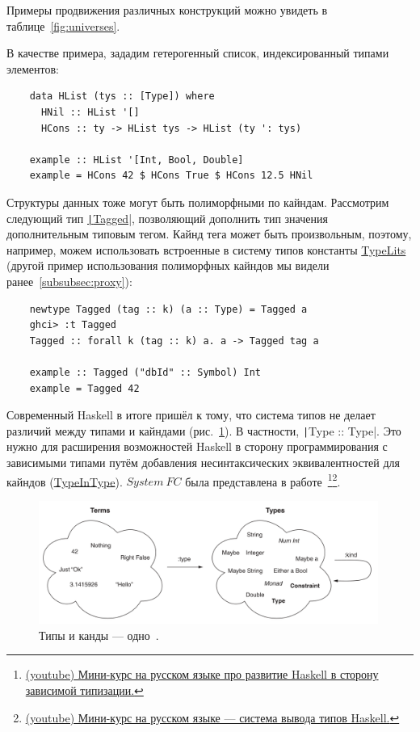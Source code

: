 Примеры продвижения различных конструкций можно увидеть в таблице~\ref{fig:universes}.

В качестве примера, зададим гетерогенный список, индексированный типами элементов:
\begin{verbatim}
    data HList (tys :: [Type]) where
      HNil :: HList '[]
      HCons :: ty -> HList tys -> HList (ty ': tys)

    example :: HList '[Int, Bool, Double]
    example = HCons 42 $ HCons True $ HCons 12.5 HNil
\end{verbatim}

Структуры данных тоже могут быть полиморфными по кайндам.
Рассмотрим следующий тип \href{https://hackage.haskell.org/package/tagged-0.8.8/docs/Data-Tagged.html#t:Tagged}{\texttt|Tagged|}, позволяющий дополнить тип значения дополнительным типовым тегом.
Кайнд тега может быть произвольным, поэтому, например, можем использовать встроенные в систему типов константы \href{https://ghc.gitlab.haskell.org/ghc/doc/users_guide/exts/type_literals.html}{TypeLits} (другой пример использования полиморфных кайндов мы видели ранее\ \ref{subsubsec:proxy}):
\begin{verbatim}
    newtype Tagged (tag :: k) (a :: Type) = Tagged a
    ghci> :t Tagged
    Tagged :: forall k (tag :: k) a. a -> Tagged tag a

    example :: Tagged ("dbId" :: Symbol) Int
    example = Tagged 42
\end{verbatim}

Современный Haskell в итоге пришёл к тому, что система типов не делает различий между типами и кайндами (рис.~\ref{fig:types-eq-kinds}).
В частности, \texttt|Type :: Type|.
Это нужно для расширения возможностей Haskell в сторону программирования с зависимыми типами путём добавления несинтаксических эквивалентностей для кайндов (\href{https://ghc.gitlab.haskell.org/ghc/doc/users_guide/exts/poly_kinds.html#extension-TypeInType}{TypeInType}).
$System~FC$ была представлена в работе~\cite{weirich2013system}\footnote{\href{https://www.youtube.com/watch?v=ISGENChlA4M&list=PLvPsfYrGz3wufQguebnCduYgQQ9UMeJRt}{(youtube) Мини-курс на русском языке про развитие Haskell в сторону зависимой типизации.}}\footnote{\href{https://www.youtube.com/watch?v=_HYI7zjkrEs&list=PLvPsfYrGz3wuVAGhNf6-i7uafXg56oqM5&index=1}{(youtube) Мини-курс на русском языке --- система вывода типов Haskell.}}. %

\begin{figure}[h]
    \centering
    \includegraphics[width=0.99\textwidth]{figs/types-eq-kinds}
    \caption{Типы и канды --- одно~\cite{bragilevsky-haskell}.}
    \label{fig:types-eq-kinds}
\end{figure}


